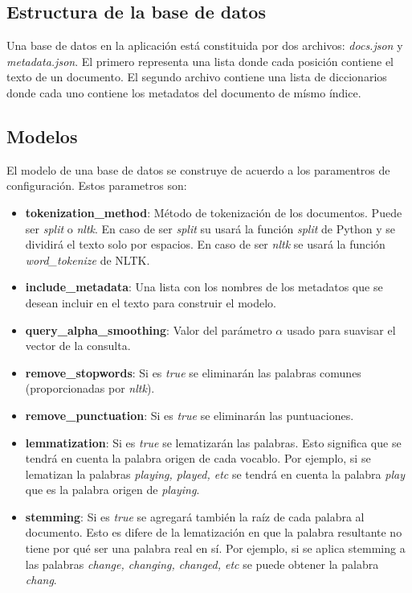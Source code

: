 \subsection{Estructura de la base de datos}\label{sec:build-database}

Una base de datos en la aplicación está constituida por dos archivos:
\emph{docs.json} y \emph{metadata.json}. El primero representa
una lista donde cada posición contiene el texto de un documento. El
segundo archivo contiene una lista de diccionarios donde cada uno
contiene los metadatos del documento de mísmo índice.

\subsection{Modelos}\label{sec:model}

El modelo de una base de datos se construye de acuerdo a los paramentros de
configuración. Estos parametros son:

\begin{itemize}
	\item \textbf{tokenization\_method}: Método de tokenización de los
		documentos. Puede ser \emph{split} o \emph{nltk}. En caso de ser
		\emph{split} su usará la función \emph{split} de Python y se
		dividirá el texto solo por espacios. En caso de ser \emph{nltk} se
		usará la función \emph{word\_tokenize} de NLTK.
	\item \textbf{include\_metadata}: Una lista con los nombres de los
		metadatos que se desean incluir en el texto para construir el modelo.
	\item \textbf{query\_alpha\_smoothing}: Valor del parámetro $\alpha$ usado
		para suavisar el vector de la consulta.
	\item \textbf{remove\_stopwords}: Si es \emph{true} se eliminarán las
		palabras comunes (proporcionadas por \emph{nltk}).
	\item \textbf{remove\_punctuation}: Si es \emph{true} se eliminarán las
		puntuaciones.
	\item \textbf{lemmatization}: Si es \emph{true} se lematizarán las
		palabras. Esto significa que se tendrá en cuenta la palabra origen de
		cada vocablo. Por ejemplo, si se lematizan la palabras \emph{playing,
		played, etc} se tendrá en cuenta la palabra \emph{play} que es la
		palabra origen de \emph{playing}.
	\item \textbf{stemming}: Si es \emph{true} se agregará también la raíz de
		cada palabra al documento. Esto es difere de la lematización en que
		la palabra resultante no tiene por qué ser una palabra real en sí. Por
		ejemplo, si se aplica stemming a las palabras \emph{change, changing,
		changed, etc} se puede obtener la palabra \emph{chang}.
\end{itemize}

